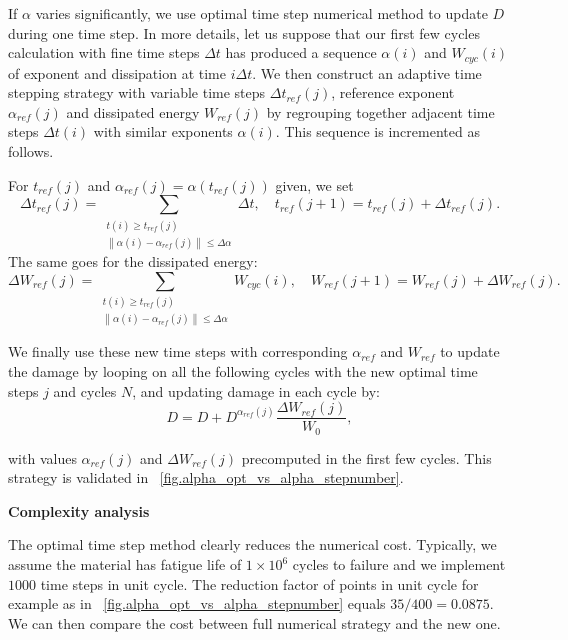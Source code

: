 \documentclass[3p,times,procedia,number]{elsarticle}
\newcommand{\figref}[1]{\figurename~\ref{#1}}
\begin{document}
If $\alpha$ varies significantly, we use optimal time step numerical method to update $D$ during one time step. In more details, let us suppose that our first few cycles calculation with fine time steps $\Delta t$ has produced a sequence $\alpha(i)$ and $W_{cyc}(i)$ of exponent and dissipation at time $i\Delta t$. We then construct an adaptive time stepping strategy with variable time steps $\Delta t_{ref}(j)$, reference exponent $\alpha_{ref}(j)$ and dissipated energy $W_{ref}(j)$ by regrouping together adjacent time steps $\Delta t(i)$ with similar exponents $\alpha(i)$. This sequence is incremented as follows.


For $t_{ref}(j)$ and $\alpha_{ref}(j)=\alpha(t_{ref}(j))$ given, we set
$$\Delta t_{ref}(j)=\sum_{\substack{t(i)\geqslant t_{ref}(j)\\\left\| \alpha(i)-\alpha_{ref}(j)\right\|\leqslant \Delta\alpha }}\Delta t, \quad t_{ref}(j+1)=t_{ref}(j)+\Delta t_{ref}(j).$$
The same goes for the dissipated energy:
$$\Delta W_{ref}(j)=\sum_{\substack{t(i)\geqslant t_{ref}(j)\\\left\| \alpha(i)-\alpha_{ref}(j)\right\|\leqslant \Delta\alpha} }W_{cyc}(i) , \quad W_{ref}(j+1)=W_{ref}(j)+\Delta W_{ref}(j).$$

We finally use these new time steps with corresponding $\alpha_{ref}$ and $W_{ref}$ to update the damage by looping on all the following cycles with the new optimal time steps $j$ and cycles $N$, and updating damage in each cycle by:
\begin{equation}
D=D+D^{\alpha_{ref}(j)}\dfrac{\Delta W_{ref}(j)}{W_0},
\label{eq.optimal}
\end{equation}

with values $\alpha_{ref}(j)$ and $\Delta W_{ref}(j)$ precomputed in the first few cycles. This strategy is validated in \figref{fig.alpha_opt_vs_alpha_stepnumber}.

\vspace{6pt}
\textbf{Complexity analysis}
\vspace{6pt}

The optimal time step method clearly reduces the numerical cost. Typically, we assume the material has fatigue life of $1\times10^{6}$ cycles to failure and we implement $1000$ time steps in unit cycle. The reduction factor of points in unit cycle for example as in \figref{fig.alpha_opt_vs_alpha_stepnumber} equals $35/400=0.0875$. We can then compare the cost between full numerical strategy and the new one.
\end{document}
